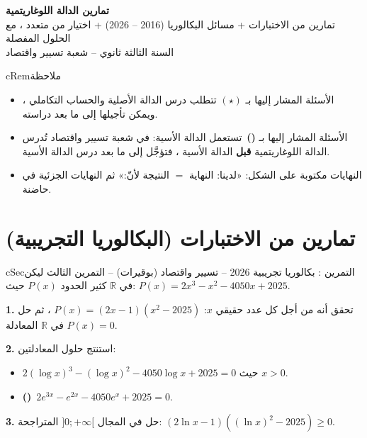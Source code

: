 \documentclass[12pt,a4paper]{article}
\newenvironment{BOX}[2]{\begin{otherlanguage}{english}\begin{arbox}{#1}{#2}}{\end{arbox}\end{otherlanguage}}
\newenvironment{molahada}[1][ملاحظة]{\begin{BOX}{cRem}{#1}}{\end{BOX}}
\newcounter{exo}
\newenvironment{tamrin}[1]{\stepcounter{exo}\begin{BOX}{cSec}{التمرين \theexo: #1}}{\end{BOX}}
\newenvironment{LTR}{\begin{otherlanguage}{english}}{\end{otherlanguage}}
\newcommand{\R}{\mathbb{R}}
\newenvironment{sq}{\begin{itemize}[leftmargin=2.4em,itemsep=3pt]}{\end{itemize}}
\newcommand{\qa}{\item[(أ)]}\newcommand{\qb}{\item[(ب)]}\newcommand{\qc}{\item[(جـ)]}\newcommand{\qd}{\item[(د)]}\newcommand{\qe}{\item[(هـ)]}
\newcommand{\QQ}[1]{\par\smallskip\textbf{#1.} }
\newcommand{\EXP}{\textcolor{cThm}{\textbf{(\ding{72}\ding{72})}}}
\begin{document}
\begin{LTR}
\begin{tcolorbox}[enhanced,colback=cSec,colframe=cSec,arc=3mm,halign=center,boxrule=0pt,top=12pt,bottom=12pt,before upper={\selectlanguage{arabic}}]
{\color{white}\fontsize{28}{34}\selectfont\bfseries تمارين الدالة اللوغاريتمية}\\[8pt]
{\color{white}\large تمارين من الاختبارات + مسائل البكالوريا (2016 -- 2026) + اختيار من متعدد ، مع الحلول المفصلة}\\[5pt]
{\color{white}\large السنة الثالثة ثانوي -- شعبة تسيير واقتصاد}
\end{tcolorbox}
\end{LTR}

\begin{molahada}
\begin{itemize}
\item الأسئلة المشار إليها بـ $(\star)$ تتطلب درس الدالة الأصلية والحساب التكاملي ، ويمكن تأجيلها إلى ما بعد دراسته.
\item الأسئلة المشار إليها بـ \EXP\ تستعمل الدالة الأسية: في شعبة تسيير واقتصاد تُدرس الدالة اللوغاريتمية \textbf{قبل} الدالة الأسية ، فتؤجَّل إلى ما بعد درس الدالة الأسية.
\item النهايات مكتوبة على الشكل: «لدينا: النهاية $=$ النتيجة لأنّ:» ثم النهايات الجزئية في حاضنة.
\end{itemize}
\end{molahada}

\section{تمارين من الاختبارات (البكالوريا التجريبية)}

\begin{tamrin}{بكالوريا تجريبية 2026 -- تسيير واقتصاد (بوقيرات) -- التمرين الثالث}
ليكن في $\R$ كثير الحدود $P(x)$ حيث: $P(x)=2x^3-x^2-4050x+2025$.
\QQ{1} تحقق أنه من أجل كل عدد حقيقي $x$: $P(x)=(2x-1)\left(x^2-2025\right)$ ، ثم حل في $\R$ المعادلة $P(x)=0$.
\QQ{2} استنتج حلول المعادلتين:
\begin{sq}
\qa $2(\log x)^3-(\log x)^2-4050\log x+2025=0$ حيث $x>0$.
\qb \EXP\ $2e^{3x}-e^{2x}-4050e^x+2025=0$.
\end{sq}
\QQ{3} حل في المجال $]0;+\infty[$ المتراجحة: $(2\ln x-1)\left((\ln x)^2-2025\right)\geqslant0$.
\end{tamrin}
\end{document}
